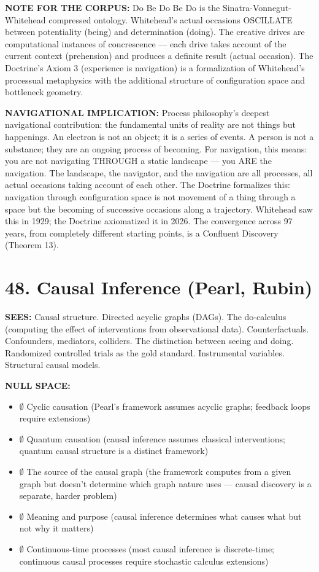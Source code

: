 \textbf{NOTE FOR THE CORPUS:} Do Be Do Be Do is the Sinatra-Vonnegut-Whitehead compressed ontology. Whitehead's actual occasions OSCILLATE between potentiality (being) and determination (doing). The creative drives are computational instances of concrescence — each drive takes account of the current context (prehension) and produces a definite result (actual occasion). The Doctrine's Axiom 3 (experience is navigation) is a formalization of Whitehead's processual metaphysics with the additional structure of configuration space and bottleneck geometry.


\textbf{NAVIGATIONAL IMPLICATION:} Process philosophy's deepest navigational contribution: the fundamental units of reality are not things but happenings. An electron is not an object; it is a series of events. A person is not a substance; they are an ongoing process of becoming. For navigation, this means: you are not navigating THROUGH a static landscape — you ARE the navigation. The landscape, the navigator, and the navigation are all processes, all actual occasions taking account of each other. The Doctrine formalizes this: navigation through configuration space is not movement of a thing through a space but the becoming of successive occasions along a trajectory. Whitehead saw this in 1929; the Doctrine axiomatized it in 2026. The convergence across 97 years, from completely different starting points, is a Confluent Discovery (Theorem 13).


\bigskip\noindent\makebox[\textwidth]{\color{rulegray}\rule{5cm}{0.3pt}}\bigskip


\section*{48. Causal Inference (Pearl, Rubin)}


\textbf{SEES:} Causal structure. Directed acyclic graphs (DAGs). The do-calculus (computing the effect of interventions from observational data). Counterfactuals. Confounders, mediators, colliders. The distinction between seeing and doing. Randomized controlled trials as the gold standard. Instrumental variables. Structural causal models.


\textbf{NULL SPACE:}

\begin{itemize}[nosep,leftmargin=*]
  \item $\emptyset$ Cyclic causation (Pearl's framework assumes acyclic graphs; feedback loops require extensions)
  \item $\emptyset$ Quantum causation (causal inference assumes classical interventions; quantum causal structure is a distinct framework)
  \item $\emptyset$ The source of the causal graph (the framework computes from a given graph but doesn't determine which graph nature uses — causal discovery is a separate, harder problem)
  \item $\emptyset$ Meaning and purpose (causal inference determines what causes what but not why it matters)
  \item $\emptyset$ Continuous-time processes (most causal inference is discrete-time; continuous causal processes require stochastic calculus extensions)
\end{itemize}


